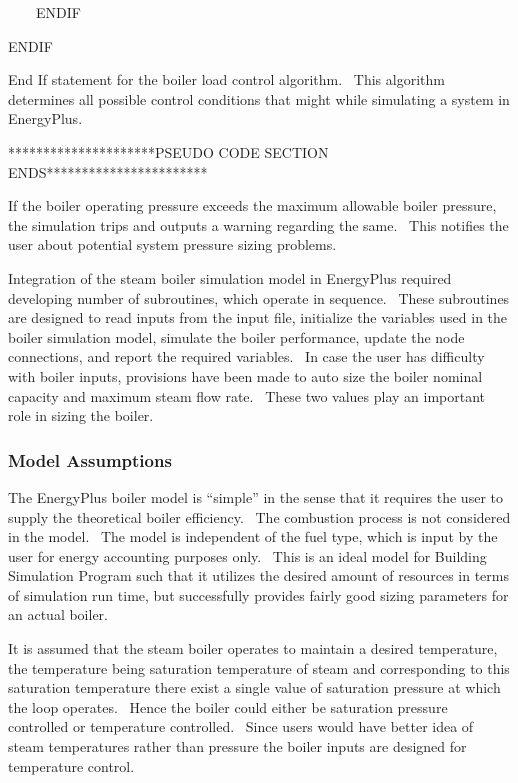 ~~~~ENDIF

ENDIF

End If statement for the boiler load control algorithm.~ This algorithm determines all possible control conditions that might while simulating a system in EnergyPlus.

*********************PSEUDO CODE SECTION ENDS***********************

If the boiler operating pressure exceeds the maximum allowable boiler pressure, the simulation trips and outputs a warning regarding the same.~ This notifies the user about potential system pressure sizing problems.

Integration of the steam boiler simulation model in EnergyPlus required developing number of subroutines, which operate in sequence.~ These subroutines are designed to read inputs from the input file, initialize the variables used in the boiler simulation model, simulate the boiler performance, update the node connections, and report the required variables.~ In case the user has difficulty with boiler inputs, provisions have been made to auto size the boiler nominal capacity and maximum steam flow rate.~ These two values play an important role in sizing the boiler.

\subsubsection{Model Assumptions}\label{model-assumptions}

The EnergyPlus boiler model is ``simple'' in the sense that it requires the user to supply the theoretical boiler efficiency.~ The combustion process is not considered in the model.~ The model is independent of the fuel type, which is input by the user for energy accounting purposes only.~ This is an ideal model for Building Simulation Program such that it utilizes the desired amount of resources in terms of simulation run time, but successfully provides fairly good sizing parameters for an actual boiler.

It is assumed that the steam boiler operates to maintain a desired temperature, the temperature being saturation temperature of steam and corresponding to this saturation temperature there exist a single value of saturation pressure at which the loop operates.~ Hence the boiler could either be saturation pressure controlled or temperature controlled.~ Since users would have better idea of steam temperatures rather than pressure the boiler inputs are designed for temperature control.

